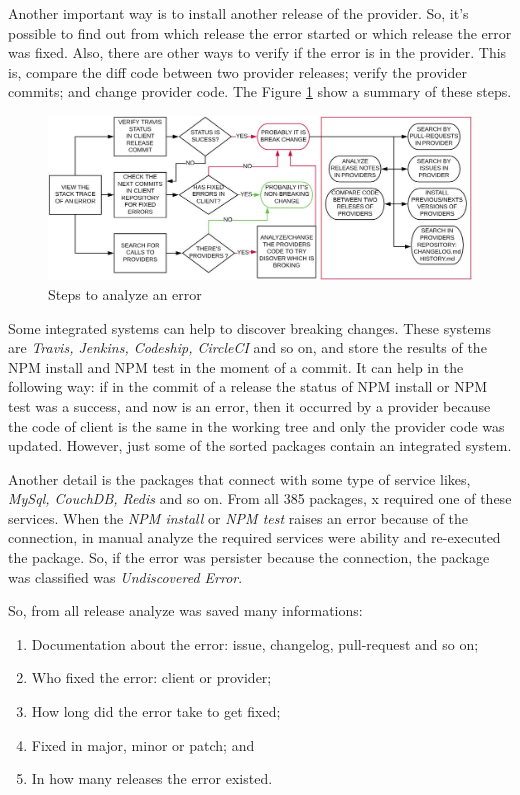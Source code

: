 Another important way is to install another release of the provider. So, it's possible to find out from which release the error started or which release the error was fixed. Also, there are other ways to verify if the error is in the provider. This is, compare the diff code between two provider releases; verify the provider commits; and change provider code.
The Figure \ref{fig:step_analyze} show a summary of these steps.

\begin{figure}
    \centering
    \includegraphics[scale=0.35]{figuras/step_analyze.jpeg}
    \caption{Steps to analyze an error}
    \label{fig:step_analyze}
\end{figure}

Some integrated systems can help to discover breaking changes. These systems are \textit{Travis, Jenkins, Codeship, CircleCI} and so on, and store the results of the \Gls{NPM} install and \Gls{NPM} test in the moment of a commit. It can help in the following way: if in the commit of a release the status of \Gls{NPM} install or \Gls{NPM} test was a success, and now is an error, then it occurred by a provider because the code of client is the same in the working tree and only the provider code was updated. However, just some of the sorted packages contain an integrated system.

Another detail is the packages that connect with some type of service likes, \textit{MySql, CouchDB, Redis} and so on. From all 385 packages, x required one of these services. When the \textit{\Gls{NPM} install} or \textit{\Gls{NPM} test} raises an error because of the connection, in manual analyze the required services were ability and re-executed the package. So, if the error was persister because the connection, the package was classified was \textit{Undiscovered Error}.

So, from all release analyze was saved many informations:

\begin{enumerate}
    \item Documentation about the error: issue, changelog, pull-request and so on;
    \item Who fixed the error: client or provider;
    \item How long did the error take to get fixed;
    \item Fixed in major, minor or patch; and
    \item In how many releases the error existed.
\end{enumerate}{}

